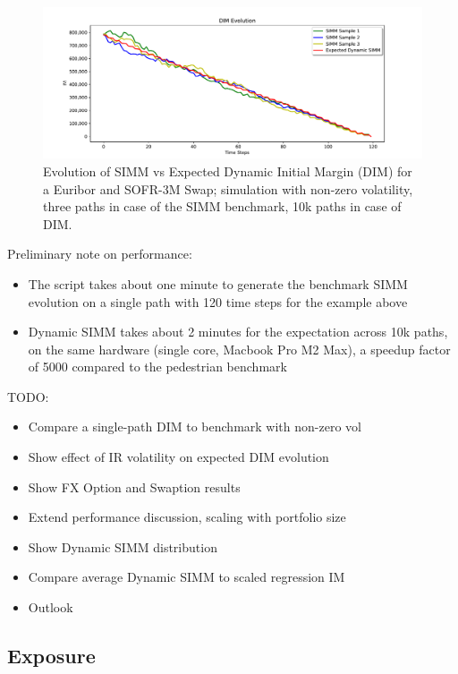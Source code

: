 \begin{figure}[h!]
\begin{center}
\includegraphics[scale=0.5]{examples/mpl_dim_comparison_3.pdf}
\end{center}
\caption{Evolution of SIMM vs Expected Dynamic Initial Margin (DIM) for a Euribor and SOFR-3M Swap;
  simulation with non-zero volatility, three paths in case of the SIMM benchmark, 10k paths in case of DIM.}
\label{fig_dim2_comparison_3}
\end{figure}

Preliminary note on performance:
\begin{itemize}
\item The script takes about one minute to generate the benchmark SIMM evolution on a single path with 120 time steps
  for the example above
\item Dynamic SIMM takes about 2 minutes for the expectation across 10k paths, on the same hardware (single core, Macbook Pro M2 Max),
  a speedup factor of 5000 compared to the pedestrian benchmark
\end{itemize}

TODO:
\begin{itemize}
\item Compare a single-path DIM to benchmark with non-zero vol
\item Show effect of IR volatility on expected DIM evolution
\item Show FX Option and Swaption results
\item Extend performance discussion, scaling with portfolio size
\item Show Dynamic SIMM distribution
\item Compare average Dynamic SIMM to scaled regression IM
\item Outlook
\end{itemize}

\subsection{Exposure}\label{example:exposure}

